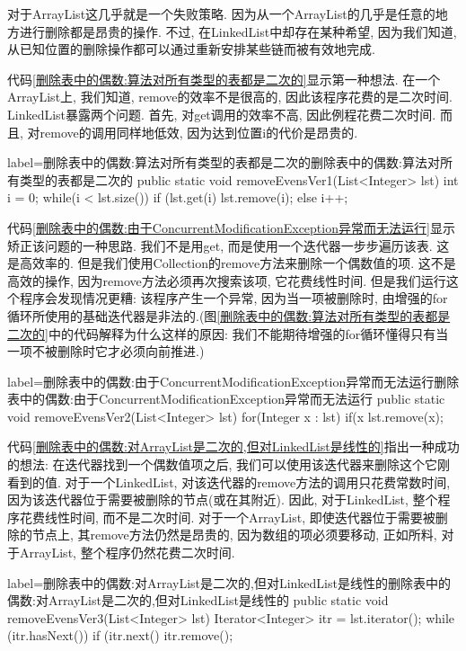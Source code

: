 \documentclass[oneside]{ctexbook}
\begin{document}
对于ArrayList这几乎就是一个失败策略. 因为从一个ArrayList的几乎是任意的地方进行删除都是昂贵的操作. 不过, 在LinkedList中却存在某种希望, 因为我们知道, 从已知位置的删除操作都可以通过重新安排某些链而被有效地完成.

代码\ref{删除表中的偶数:算法对所有类型的表都是二次的}显示第一种想法. 在一个ArrayList上, 我们知道, remove的效率不是很高的, 因此该程序花费的是二次时间. LinkedList暴露两个问题. 首先, 对get调用的效率不高, 因此例程花费二次时间. 而且, 对remove的调用同样地低效, 因为达到位置i的代价是昂贵的.

\begin{myjava}{label={删除表中的偶数:算法对所有类型的表都是二次的}}{删除表中的偶数:算法对所有类型的表都是二次的}
public static void removeEvensVer1(List<Integer> lst) {
    int i = 0;
    while(i < lst.size())
        if (lst.get(i) %
            lst.remove(i);
        else
            i++;
}
\end{myjava}

代码\ref{删除表中的偶数:由于ConcurrentModificationException异常而无法运行}显示矫正该问题的一种思路. 我们不是用get, 而是使用一个迭代器一步步遍历该表. 这是高效率的. 但是我们使用Collection的remove方法来删除一个偶数值的项. 这不是高效的操作, 因为remove方法必须再次搜索该项, 它花费线性时间. 但是我们运行这个程序会发现情况更糟: 该程序产生一个异常, 因为当一项被删除时, 由增强的for循环所使用的基础迭代器是非法的.(图\ref{删除表中的偶数:算法对所有类型的表都是二次的}中的代码解释为什么这样的原因: 我们不能期待增强的for循环懂得只有当一项不被删除时它才必须向前推进.)

\begin{myjava}{label={删除表中的偶数:由于ConcurrentModificationException异常而无法运行}}{删除表中的偶数:由于ConcurrentModificationException异常而无法运行}
public static void removeEvensVer2(List<Integer> lst) {
    for(Integer x : lst)
        if(x %
            lst.remove(x);
}
\end{myjava}

代码\ref{删除表中的偶数:对ArrayList是二次的,但对LinkedList是线性的}指出一种成功的想法: 在迭代器找到一个偶数值项之后, 我们可以使用该迭代器来删除这个它刚看到的值. 对于一个LinkedList, 对该迭代器的remove方法的调用只花费常数时间, 因为该迭代器位于需要被删除的节点(或在其附近). 因此, 对于LinkedList, 整个程序花费线性时间, 而不是二次时间. 对于一个ArrayList, 即使迭代器位于需要被删除的节点上, 其remove方法仍然是昂贵的, 因为数组的项必须要移动, 正如所料, 对于ArrayList, 整个程序仍然花费二次时间.

\begin{myjava}{label={删除表中的偶数:对ArrayList是二次的,但对LinkedList是线性的}}{删除表中的偶数:对ArrayList是二次的,但对LinkedList是线性的}
public static void removeEvensVer3(List<Integer> lst) {
    Iterator<Integer> itr = lst.iterator();
    while (itr.hasNext())
        if (itr.next() %
            itr.remove();
}
\end{myjava}
\end{document}
